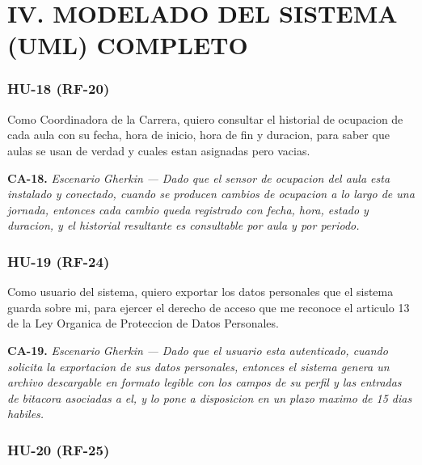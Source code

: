 \section*{IV. MODELADO DEL SISTEMA (UML) COMPLETO}


\subsubsection*{HU-18 (RF-20)}


Como Coordinadora de la Carrera, quiero consultar el historial de ocupacion de cada aula con su fecha, hora de inicio, hora de fin y duracion, para saber que aulas se usan de verdad y cuales estan asignadas pero vacias.


\textbf{CA-18.} \textit{Escenario }\textit{Gherkin}\textit{ --- Dado que el sensor de ocupacion del aula esta instalado y conectado, cuando se producen cambios de ocupacion a lo largo de una jornada, entonces cada cambio queda registrado con fecha, hora, estado y duracion, y el historial resultante es consultable por aula y por periodo.}

\subsubsection*{HU-19 (RF-24)}


Como usuario del sistema, quiero exportar los datos personales que el sistema guarda sobre mi, para ejercer el derecho de acceso que me reconoce el articulo 13 de la Ley Organica de Proteccion de Datos Personales.


\textbf{CA-19.} \textit{Escenario }\textit{Gherkin}\textit{ --- Dado que el usuario esta autenticado, cuando solicita la exportacion de sus datos personales, entonces el sistema genera un archivo descargable en formato legible con los campos de su perfil y las entradas de bitacora asociadas a el, y lo pone a disposicion en un plazo maximo de 15 dias habiles.}

\subsubsection*{HU-20 (RF-25)}


